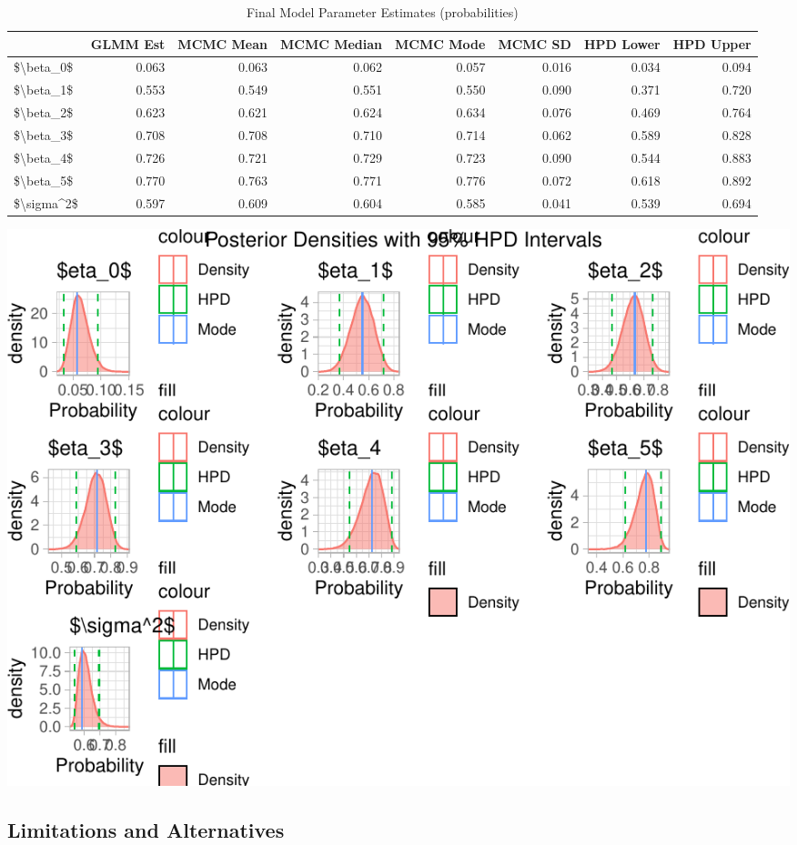 \documentclass[
]{article}
\begin{document}
\begin{table}

\caption{\label{tab:bayes_tab}Final Model Parameter Estimates (probabilities)}
\centering
\begin{tabular}[t]{l|r|r|r|r|r|r|r}
\hline
  & GLMM Est & MCMC Mean & MCMC Median & MCMC Mode & MCMC SD & HPD Lower & HPD Upper\\
\hline
\$\textbackslash{}beta\_0\$ & 0.063 & 0.063 & 0.062 & 0.057 & 0.016 & 0.034 & 0.094\\
\hline
\$\textbackslash{}beta\_1\$ & 0.553 & 0.549 & 0.551 & 0.550 & 0.090 & 0.371 & 0.720\\
\hline
\$\textbackslash{}beta\_2\$ & 0.623 & 0.621 & 0.624 & 0.634 & 0.076 & 0.469 & 0.764\\
\hline
\$\textbackslash{}beta\_3\$ & 0.708 & 0.708 & 0.710 & 0.714 & 0.062 & 0.589 & 0.828\\
\hline
\$\textbackslash{}beta\_4\$ & 0.726 & 0.721 & 0.729 & 0.723 & 0.090 & 0.544 & 0.883\\
\hline
\$\textbackslash{}beta\_5\$ & 0.770 & 0.763 & 0.771 & 0.776 & 0.072 & 0.618 & 0.892\\
\hline
\$\textbackslash{}sigma\textasciicircum{}2\$ & 0.597 & 0.609 & 0.604 & 0.585 & 0.041 & 0.539 & 0.694\\
\hline
\end{tabular}
\end{table}

\includegraphics{final_report_files/figure-latex/postdens-1.pdf}

\hypertarget{limitations-and-alternatives}{%
\subsection{Limitations and
Alternatives}\label{limitations-and-alternatives}}
\end{document}

